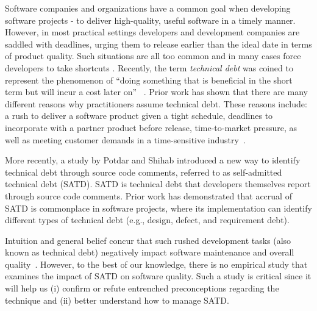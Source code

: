 
Software companies and organizations have a common goal when developing software projects - to deliver high-quality, useful software in a timely manner. However, in most practical settings developers and development companies are saddled with deadlines, urging them to release earlier than the ideal date in terms of product quality. Such situations are all too common and in many cases force developers to take shortcuts \cite{kruchten2013technical} \cite{seaman2015technical}. Recently, the term \emph{technical debt} was coined to represent the phenomenon of ``doing something that is beneficial in the short term but will incur a cost later on''~ \cite{cunningham1993wycash}. Prior work has shown that there are many different reasons why practitioners assume technical debt. These reasons include: a rush to deliver a software product given a tight schedule, deadlines to incorporate with a partner product before release, time-to-market pressure, as well as meeting customer demands in a time-sensitive industry~\cite{lim2012balancing}.


More recently, a study by Potdar and Shihab \cite{ICSM_PotdarS14} introduced a new way to identify technical debt through source code comments, referred to as self-admitted technical debt (SATD). SATD is technical debt that developers themselves report through source code comments. Prior work \cite{MTD15p9} has demonstrated that accrual of SATD is commonplace in software projects, where its implementation can identify different types of technical debt (e.g., design, defect, and requirement debt).

Intuition and general belief concur that such rushed development tasks (also known as technical debt) negatively impact software maintenance and overall quality~\cite{zazworka2011investigating,spinola2013investigating,GuoSGCTSSS11,seaman2015technical,kruchten2013technical}. However, to the best of our knowledge, there is no empirical study that examines the impact of SATD on software quality. Such a study is critical since it will help us (i) confirm or refute entrenched preconceptions regarding the technique and (ii) better understand how to manage SATD.

